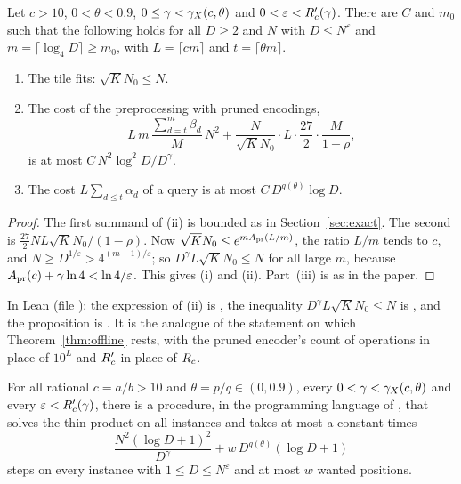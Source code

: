 \begin{proposition}\label{prop:costP}
Let \(c>10\), \(0<\theta<0.9\), \(0\le\gamma<\gamma_{X}(c,\theta)\) and
\(0<\varepsilon<R'_{c}(\gamma)\).  There are \(C\) and \(m_0\) such that the
following holds for all \(D\ge2\) and \(N\) with \(D\le N^{\varepsilon}\) and
\(m=\lceil\log_4 D\rceil\ge m_0\), with \(L=\lceil cm\rceil\) and
\(t=\lceil\theta m\rceil\).
\begin{enumerate}
\item The tile fits: \(\sqrt K N_0\le N\).
\item The cost of the preprocessing with pruned encodings,
  \[
    L\,m\,\frac{\sum_{d=t}^{m}\beta_d}{M}\,N^{2}
    +\frac{N}{\sqrt K N_0}\cdot L\cdot\frac{27}{2}\cdot\frac{M}{1-\rho},
  \]
  is at most \(C\,N^{2}\log^{2}D/D^{\gamma}\).
\item The cost \(L\sum_{d\le t}\alpha_d\) of a query is at most
  \(C\,D^{q(\theta)}\log D\).
\end{enumerate}
\end{proposition}

\begin{proof}
The first summand of (ii) is bounded as in Section~\ref{sec:exact}.  The second
is \(\frac{27}{2}NL\sqrt K N_0/(1-\rho)\).  Now
\(\sqrt K N_0\le e^{mA_{\mathrm{pr}}(L/m)}\), the ratio \(L/m\) tends to \(c\), and
\(N\ge D^{1/\varepsilon}>4^{(m-1)/\varepsilon}\); so
\(D^{\gamma}L\sqrt K N_0\le N\) for all large \(m\), because
\(A_{\mathrm{pr}}(c)+\gamma\ln 4<\ln 4/\varepsilon\).  This gives (i) and (ii).  Part~(iii)
is as in the paper.
\end{proof}

In Lean (file ): the expression of (ii) is
, the inequality \(D^{\gamma}L\sqrt K N_0\le N\) is ,
and the proposition is .  It is the analogue of the statement
 on which Theorem~\ref{thm:offline} rests, with the pruned
encoder's count of operations in place of \(10^{L}\) and \(R'_{c}\) in place of
\(R_{c}\).

\begin{theorem}\label{thm:encoder}
For all rational \(c=a/b>10\) and \(\theta=p/q\in(0,0.9)\), every
\(0<\gamma<\gamma_{X}(c,\theta)\) and every \(\varepsilon<R'_{c}(\gamma)\), there is a
procedure, in the programming language of \cite{upstream}, that solves the thin
product on all instances and takes at most a constant times
\[
  \frac{N^{2}(\log D+1)^{2}}{D^{\gamma}}+w\,D^{q(\theta)}(\log D+1)
\]
steps on every instance with \(1\le D\le N^{\varepsilon}\) and at most \(w\)
wanted positions.
\end{theorem}

